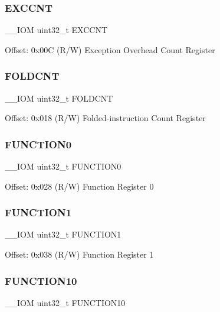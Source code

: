 \subsubsection{\texorpdfstring{EXCCNT}{EXCCNT}}
{\footnotesize\ttfamily \+\_\+\+\_\+\+I\+OM uint32\+\_\+t E\+X\+C\+C\+NT}

Offset\+: 0x00C (R/W) Exception Overhead Count Register \mbox{\label{struct_d_w_t___type_a6324c1fbf6c94f1eaf742d09ad678216}} 
\subsubsection{\texorpdfstring{FOLDCNT}{FOLDCNT}}
{\footnotesize\ttfamily \+\_\+\+\_\+\+I\+OM uint32\+\_\+t F\+O\+L\+D\+C\+NT}

Offset\+: 0x018 (R/W) Folded-\/instruction Count Register \mbox{\label{struct_d_w_t___type_ad3c69d206a52a85165eb7bd8077b0608}} 
\subsubsection{\texorpdfstring{FUNCTION0}{FUNCTION0}}
{\footnotesize\ttfamily \+\_\+\+\_\+\+I\+OM uint32\+\_\+t F\+U\+N\+C\+T\+I\+O\+N0}

Offset\+: 0x028 (R/W) Function Register 0 \mbox{\label{struct_d_w_t___type_ae8f02e32e101c4cc61115d271fa12ffb}} 
\subsubsection{\texorpdfstring{FUNCTION1}{FUNCTION1}}
{\footnotesize\ttfamily \+\_\+\+\_\+\+I\+OM uint32\+\_\+t F\+U\+N\+C\+T\+I\+O\+N1}

Offset\+: 0x038 (R/W) Function Register 1 \mbox{\label{struct_d_w_t___type_a87175ae057853babe4b55c2bf32ff933}} 
\subsubsection{\texorpdfstring{FUNCTION10}{FUNCTION10}}
{\footnotesize\ttfamily \+\_\+\+\_\+\+I\+OM uint32\+\_\+t F\+U\+N\+C\+T\+I\+O\+N10}

